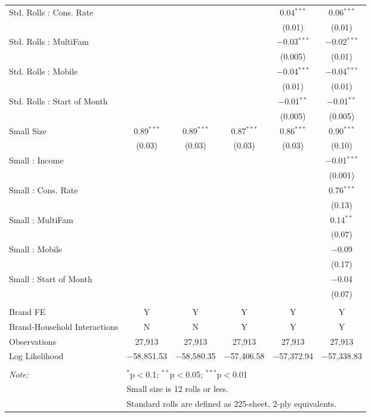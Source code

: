 \begin{table}[!htbp]
\begin{tabular}{@{\extracolsep{5pt}}lccccc}
  Std. Rolls : Cons. Rate &  &  &  & 0.04$^{***}$ & 0.06$^{***}$ \\ 
  &  &  &  & (0.01) & (0.01) \\ 
  Std. Rolls : MultiFam &  &  &  & $-$0.03$^{***}$ & $-$0.02$^{***}$ \\ 
  &  &  &  & (0.005) & (0.01) \\ 
  Std. Rolls : Mobile &  &  &  & $-$0.04$^{***}$ & $-$0.04$^{***}$ \\ 
  &  &  &  & (0.01) & (0.01) \\ 
  Std. Rolls : Start of Month &  &  &  & $-$0.01$^{**}$ & $-$0.01$^{**}$ \\ 
  &  &  &  & (0.005) & (0.005) \\ 
  Small Size & 0.89$^{***}$ & 0.89$^{***}$ & 0.87$^{***}$ & 0.86$^{***}$ & 0.90$^{***}$ \\ 
  & (0.03) & (0.03) & (0.03) & (0.03) & (0.10) \\ 
  Small : Income &  &  &  &  & $-$0.01$^{***}$ \\ 
  &  &  &  &  & (0.001) \\ 
  Small : Cons. Rate &  &  &  &  & 0.76$^{***}$ \\ 
  &  &  &  &  & (0.13) \\ 
  Small : MultiFam &  &  &  &  & 0.14$^{**}$ \\ 
  &  &  &  &  & (0.07) \\ 
  Small : Mobile &  &  &  &  & $-$0.09 \\ 
  &  &  &  &  & (0.17) \\ 
  Small : Start of Month &  &  &  &  & $-$0.04 \\ 
  &  &  &  &  & (0.07) \\ 
 \hline \\[-1.8ex] 
Brand FE & Y & Y & Y & Y & Y \\ 
Brand-Household Interactions & N & N & Y & Y & Y \\ 
Observations & 27,913 & 27,913 & 27,913 & 27,913 & 27,913 \\ 
Log Likelihood & $-$58,851.53 & $-$58,580.35 & $-$57,406.58 & $-$57,372.94 & $-$57,338.83 \\ 
\hline 
\hline \\[-1.8ex] 
\textit{Note:}  & \multicolumn{5}{l}{$^{*}$p$<$0.1; $^{**}$p$<$0.05; $^{***}$p$<$0.01} \\ 
 & \multicolumn{5}{l}{Small size is 12 rolls or less.} \\ 
 & \multicolumn{5}{l}{Standard rolls are defined as 225-sheet, 2-ply equivalents.} \\ 
\end{tabular} 
\end{table} 
